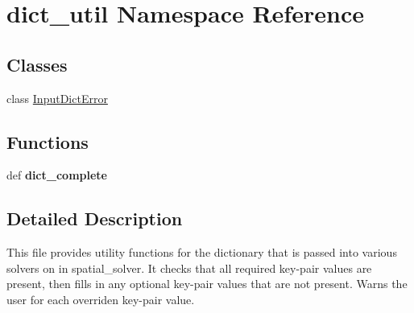 \hypertarget{namespacedict__util}{\section{dict\-\_\-util Namespace Reference}
\label{namespacedict__util}
}
\subsection*{Classes}
\begin{DoxyCompactItemize}
\item 
class \hyperlink{classdict__util_1_1_input_dict_error}{Input\-Dict\-Error}
\end{DoxyCompactItemize}
\subsection*{Functions}
\begin{DoxyCompactItemize}
\item 
\hypertarget{namespacedict__util_ae77e2d6dc8c45476739eff9bb8f257ea}{def {\bfseries dict\-\_\-complete}}\label{namespacedict__util_ae77e2d6dc8c45476739eff9bb8f257ea}

\end{DoxyCompactItemize}


\subsection{Detailed Description}
\begin{DoxyVerb}This file provides utility functions for the dictionary that is passed into various solvers on in spatial_solver.  It checks that all required key-pair values are present, then fills in any optional key-pair values that are not present.  Warns the user for each overriden key-pair value.\end{DoxyVerb}
 
